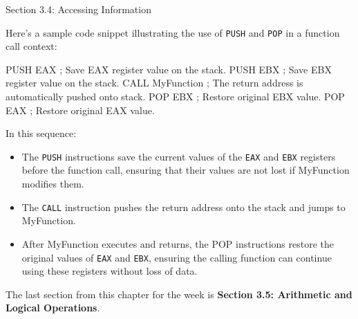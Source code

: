 \begin{notes}{Section 3.4: Accessing Information}
    \begin{highlight}
        Here's a sample code snippet illustrating the use of \texttt{PUSH} and \texttt{POP} in a function call context:
    
    \begin{code}[Assembly]
    PUSH EAX                ; Save EAX register value on the stack.
    PUSH EBX                ; Save EBX register value on the stack.
    CALL MyFunction         ; The return address is automatically pushed onto stack.
    POP EBX                 ; Restore original EBX value.
    POP EAX                 ; Restore original EAX value.        
    \end{code}

        In this sequence:

        \begin{itemize}
            \item The \texttt{PUSH} instructions save the current values of the \texttt{EAX} and \texttt{EBX} registers before the function call, ensuring that their values are not lost if MyFunction 
            modifies them.
            \item The \texttt{CALL} instruction pushes the return address onto the stack and jumps to MyFunction.
            \item After MyFunction executes and returns, the POP instructions restore the original values of \texttt{EAX} and \texttt{EBX}, ensuring the calling function can continue using these 
            registers without loss of data.
        \end{itemize}
    \end{highlight}
\end{notes}

The last section from this chapter for the week is \textbf{Section 3.5: Arithmetic and Logical Operations}.

